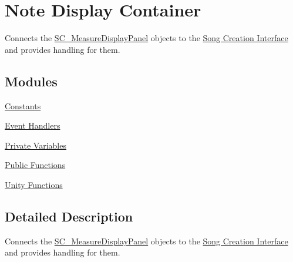\hypertarget{group___doc_s_c___n_d_c}{}\section{Note Display Container}
\label{group___doc_s_c___n_d_c}


Connects the \hyperlink{class_s_c___measure_display_panel}{S\+C\+\_\+\+Measure\+Display\+Panel} objects to the \hyperlink{group___doc_s_c}{Song Creation Interface} and provides handling for them.  


\subsection*{Modules}
\begin{DoxyCompactItemize}
\item 
\hyperlink{group___s_c___n_d_c_const}{Constants}
\item 
\hyperlink{group___s_c___n_d_c_handlers}{Event Handlers}
\item 
\hyperlink{group___s_c___n_d_c_priv_var}{Private Variables}
\item 
\hyperlink{group___s_c___n_d_c_pub_func}{Public Functions}
\item 
\hyperlink{group___s_c___n_d_c_unity}{Unity Functions}
\end{DoxyCompactItemize}


\subsection{Detailed Description}
Connects the \hyperlink{class_s_c___measure_display_panel}{S\+C\+\_\+\+Measure\+Display\+Panel} objects to the \hyperlink{group___doc_s_c}{Song Creation Interface} and provides handling for them. 

